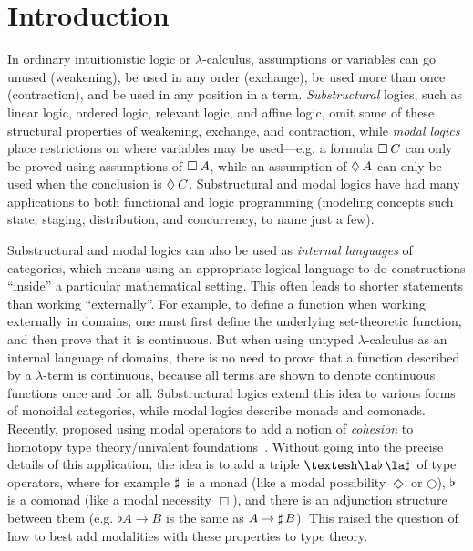
\section{Introduction}

In ordinary intuitionistic logic or $\lambda$-calculus, assumptions or
variables can go unused (weakening), be used in any order (exchange), be
used more than once (contraction), and be used in any position in a
term.  \emph{Substructural} logics, such as linear logic, ordered logic,
relevant logic, and affine logic, omit some of these structural
properties of weakening, exchange, and contraction, while \emph{modal
  logics} place restrictions on where variables may be used---e.g. a
formula $\Box_{} \, {C}$ can only be proved using assumptions of $\Box_{} \, {A}$,
while an assumption of $\Diamond_{} \, {A}$ can only be used when the conclusion
is $\Diamond_{} \, {C}$.  Substructural and modal logics have had many
applications to both functional and logic programming (modeling concepts
such state, staging, distribution, and concurrency, to name just a few).

Substructural and modal logics can also be used as \emph{internal
  languages} of categories, which means using an appropriate logical
language to do constructions ``inside'' a particular mathematical
setting.  This often leads to shorter statements than working
``externally''.  For example, to define a function when working
externally in domains, one must first define the underlying
set-theoretic function, and then prove that it is continuous.  But when
using untyped $\lambda$-calculus as an internal language of domains,
there is no need to prove that a function described by a $\lambda$-term
is continuous, because all terms are shown to denote continuous functions
once and for all.  Substructural logics extend this idea to various
forms of monoidal categories, while modal logics describe monads and
comonads.  Recently,
\citet{schreibershulman12cohesive,shulman15realcohesion} proposed using
modal operators to add a notion of \emph{cohesion} to homotopy type
theory/univalent foundations~\citep{voevodsky06homotopy,uf13hott-book}.
Without going into the precise details of this application, the idea is
to add a triple $\sh{} \la \Flat{} \la \Sharp{}$ of type operators,
where for example $\sharp \, {}$ is a monad (like a modal possibility
$\Diamond$ or $\bigcirc$), $\flat \, {}$ is a comonad (like a modal
necessity $\Box$), and there is an adjunction structure between them
(e.g. $\flat{A} \to B$ is the same as $A \to \sharp \, {B}$).  This raised
the question of how to best add modalities with these properties to type
theory.

